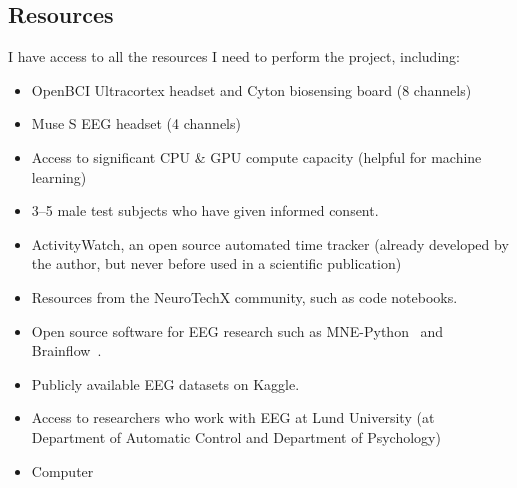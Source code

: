 \documentclass{IEEEtran}
\begin{document}
\begin{refsection}
\section{Resources}

I have access to all the resources I need to perform the project, including:

\begin{itemize}
  \item OpenBCI Ultracortex headset and Cyton biosensing board (8 channels)
  \item Muse S EEG headset (4 channels)
  \item Access to significant CPU \& GPU compute capacity (helpful for machine learning)
  \item 3--5 male test subjects who have given informed consent.
  \item ActivityWatch, an open source automated time tracker (already developed by the author, but never before used in a scientific publication)
  \item Resources from the NeuroTechX community, such as code notebooks.\cite{barachant_eeg-notebooks_2020}
  \item Open source software for EEG research such as MNE-Python~\cite{noauthor_mne-python_2020} and Brainflow~\cite{noauthor_brainflow_2020}.
  \item Publicly available EEG datasets on Kaggle.\cite{noauthor_search_nodate}
  \item Access to researchers who work with EEG at Lund University (at Department of Automatic Control and Department of Psychology)
  \item Computer
\end{itemize}

\printbibliography[category=cited]

\nocite{*}
  {\list{}
     {\setlength{\leftmargin}{\bibhang}%
      \setlength{\itemindent}{-\leftmargin}%
      \setlength{\itemsep}{\bibitemsep}%
      \setlength{\parsep}{\bibparsep}}
  }
  {\endlist}
  {\item}
\printbibliography[notcategory=cited, env=bibnonum, heading=notcited]

\end{refsection}
\end{document}
